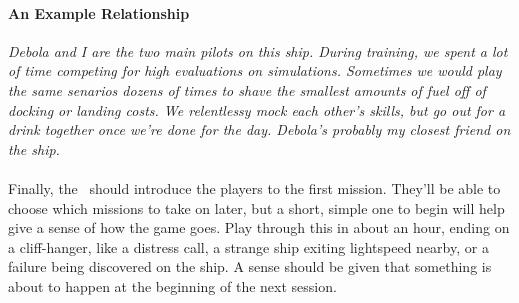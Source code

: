 \paragraph{An Example Relationship}
\textit{Debola and I are the two main pilots on this ship. During training, we spent a lot of time competing for high evaluations on simulations. Sometimes we would play the same senarios dozens of times to shave the smallest amounts of fuel off of docking or landing costs. We relentlessy mock each other's skills, but go out for a drink together once we're done for the day. Debola's probably my closest friend on the ship.}

\paragraph{}
Finally, the \gm\, should introduce the players to the first mission. They'll be able to choose which missions to take on later, but a short, simple one to begin will help give a sense of how the game goes. Play through this in about an hour, ending on a cliff-hanger, like a distress call, a strange ship exiting lightspeed nearby, or a failure being discovered on the ship. A sense should be given that something is about to happen at the beginning of the next session.